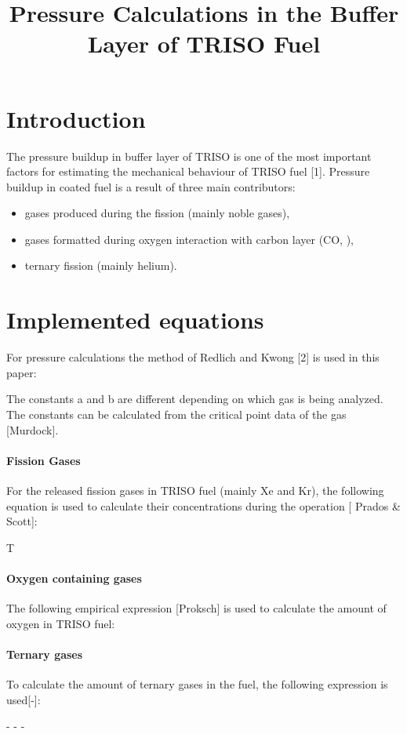\documentclass[review]{elsarticle}
\begin{document}
\begin{frontmatter}

\title{Pressure Calculations in the Buffer Layer of TRISO Fuel}

\end{frontmatter}


\section{Introduction} The pressure buildup in buffer layer of TRISO is one of the most important factors for estimating the mechanical behaviour of TRISO  fuel [1]. Pressure buildup in coated fuel is a result of three main contributors: 
\begin{itemize}
\item gases produced during the fission (mainly noble gases), 
\item gases formatted during oxygen interaction with carbon layer (CO, ), 
\item ternary fission (mainly helium).
\end{itemize}

\section{Implemented equations}
For pressure calculations the method of Redlich and Kwong [2] is used in this paper: 

\PressureRK

The constants a and b are different depending on which gas is being analyzed. The constants can be calculated from the critical point data of the gas [Murdock].

\paragraph{Fission Gases} For the released fission gases in TRISO fuel (mainly Xe and Kr), the following equation is used to calculate their concentrations during the operation [ Prados \& Scott]:

\NumDenFGs

T\paragraph{Oxygen containing gases} The following empirical expression [Proksch] is used to calculate the amount of oxygen in TRISO fuel:

\PressureProksh 

\paragraph{Ternary gases} To calculate the amount of ternary gases in the fuel, the following expression is used[-]:

- - -
\end{document}
